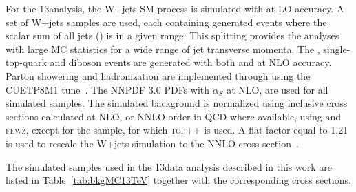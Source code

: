 For the 13\TeV analysis, the W+jets SM process is simulated with \amcatnlo{} at LO accuracy.
A set of W+jets samples are used, each containing generated events where the scalar \pt sum of all jets (\HT) is in a given range.
This splitting provides the analyses with large MC statistics for a wide range of jet transverse momenta.
The \ttbar, single-top-quark and diboson events are generated with both \POWHEG{} and \amcatnlo{} at NLO accuracy.
Parton showering and hadronization are implemented through  using the CUETP8M1 tune~\cite{Skands:2014pea,Khachatryan:2015pea}.
The NNPDF 3.0 PDFs with $\alpha_S$ at NLO, are used for all simulated samples. 
The simulated background is normalized using inclusive cross sections calculated at NLO, or NNLO order in QCD where available, using \MCFM{} and \textsc{fewz},
except for the \ttbar sample, for which \textsc{top++} is used.
A flat factor equal to 1.21 is used to rescale the W+jets simulation to the NNLO cross section~\cite{Binoth:2010nha}.

The simulated samples used in the 13\TeV data analysis described in this work are listed in Table~\ref{tab:bkgMC13TeV} together with the corresponding cross sections.

